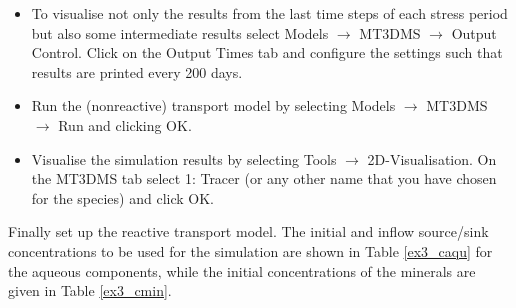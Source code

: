 \begin{itemize}

\item To visualise not only the results from the last time steps of each stress period but also some intermediate results select Models $\rightarrow$ MT3DMS $\rightarrow$ Output Control. Click on the Output Times tab and configure the settings such that results are printed every 200 days.

\item Run the (nonreactive) transport model by selecting Models $\rightarrow$ MT3DMS $\rightarrow$ Run and clicking OK.

\item Visualise the simulation results by selecting Tools $\rightarrow$ 2D-Visualisation. On the MT3DMS tab select 1: Tracer (or any other name that you have chosen for the species) and click OK.

\end{itemize}

Finally set up the reactive transport model. The initial and inflow source/sink
concentrations to be used for the simulation are shown in Table \ref{ex3_caqu} for the aqueous
components, while the initial concentrations of the minerals are
given in Table \ref{ex3_cmin}. 

